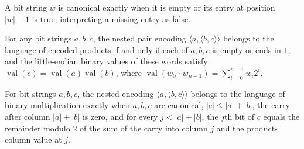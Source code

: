 \begin{lemma}
\label{Complexity.mult_canonical_last}
\leanok
{}
A bit string $w$ is canonical exactly when it is empty or its entry at position $|w|-1$
is true, interpreting a missing entry as false.
\end{lemma}

\begin{lemma}
\label{Complexity.mult_membership}
\leanok
{}
For any bit strings $a,b,c$, the nested pair encoding $\langle a,\langle
b,c\rangle\rangle$ belongs to the language of encoded products if and only if each of
$a,b,c$ is empty or ends in $1$, and the little-endian binary values of these words
satisfy $\operatorname{val}(c)=\operatorname{val}(a)\operatorname{val}(b)$, where
$\operatorname{val}(w_0\cdots w_{n-1})=\sum_{i=0}^{n-1}w_i2^i$.
\end{lemma}

\begin{lemma}
\label{Complexity.mult_acceptance}
\leanok
{}
For bit strings $a,b,c$, the nested encoding $\langle a,\langle b,c\rangle\rangle$
belongs to the language of binary multiplication exactly when $a,b,c$ are canonical,
$|c|\le |a|+|b|$, the carry after column $|a|+|b|$ is zero, and for every $j<|a|+|b|$,
the $j$th bit of $c$ equals the remainder modulo $2$ of the sum of the carry into column
$j$ and the product-column value at $j$.
\end{lemma}


